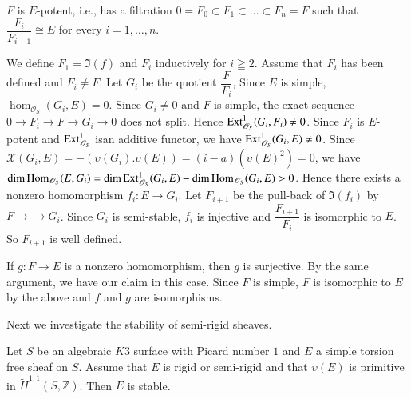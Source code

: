 \begin{claim}
$F$ is $E$-potent, i.e., has a filtration $0=F_0\subset
F_1\subset\ldots \subset F_n=F$  such that $\dfrac{F_i}{F_{i-1}}\cong
E$ for every $i=1,\ldots,n$.

We define $F_1=\Im(f)$ and $F_i$ inductively for $i\geqq 2$. Assume
that $F_i$ has been defined and $F_i\neq F$. Let $G_i$ be the quotient
$\dfrac{F}{F_i}$, Since $E$ is simple,
$\hom_{\mathscr{O}_S}(G_i,E)=0$. Since $G_i\neq 0$ and $F$ is simple,
the exact sequence $0\to F_i\to F\to G_i\to 0$ does not split. Hence
$\mathrm{Ext}^{1}_{\mathscr{O}_S}(G_i,F_i)\neq 0$. Since $F_i$ is $E$-potent
and $\mathrm{Ext}^{1}_{\mathscr{O}_S}$ is\pageoriginale an additive functor, we have
$\mathrm{Ext}^{1}_{\mathscr{O}_S}(G_i,E)\neq 0$. Since
$\mathcal{X}(G_i,E)=-(\upsilon(G_i).\upsilon(E))=(i-a)\left(\upsilon(E)^{2}\right)=0$,
we have
$\dim\mathrm{Hom}_{\mathscr{O}_S}(E,G_i)=\dim \mathrm{Ext}^{1}_{\mathscr{O}_S}(G_i,E)-\dim\mathrm{Hom}_{\mathscr{O}_S}(G_i,E)>0$. Hence
there exists a nonzero homomorphism $f_i:E\to G_i$. Let $F_{i+1}$ be
the pull-back of $\Im(f_i)$ by $F\to\to G_i$. Since $G_i$ is
semi-stable, $f_i$ is injective and $\dfrac{F_{i+1}}{F_i}$ is
isomorphic to $E$. So $F_{i+1}$ is well defined.

If $g:F\to E$ is a nonzero homomorphism, then $g$ is surjective. By the
same argument, we have our claim in this case. Since $F$ is simple,
$F$ is isomorphic to $E$ by the above and $f$ and $g$ are
isomorphisms.
\enprf
\end{claim}

Next we investigate the stability of semi-rigid sheaves.

\begin{Prop}\label{Prop3.14}
Let $S$ be an algebraic $K3$ surface with Picard number $1$ and $E$ a
simple torsion free sheaf on $S$. Assume that $E$ is rigid or
semi-rigid and that $\upsilon(E)$ is primitive in
$\widetilde{H}^{1,1}(S,\mathbb{Z})$. Then $E$ is stable.
\end{Prop}

